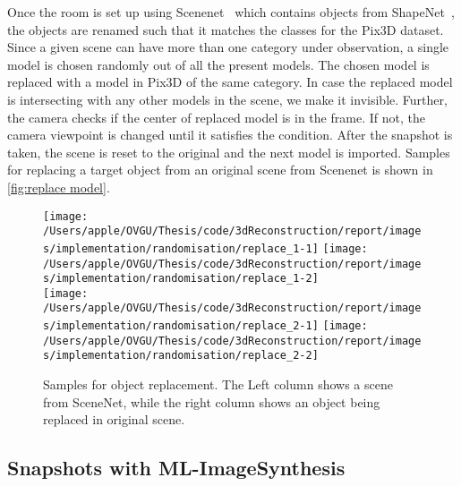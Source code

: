 Once the room is set up using Scenenet~\cite{McCormac:etal:ICCV2017} which contains objects from ShapeNet~\cite{chang2015shapenet}, the objects are renamed such that it matches the classes for the Pix3D dataset.
Since a given scene can have more than one category under observation, a single model is chosen randomly out of all the present models.
The chosen model is replaced with a model in Pix3D of the same category.
In case the replaced model is intersecting with any other models in the scene, we make it invisible.
Further, the camera checks if the center of replaced model is in the frame.
If not, the camera viewpoint is changed until it satisfies the condition.
After the snapshot is taken, the scene is reset to the original and the next model is imported.
Samples for replacing a target object from an original scene from Scenenet is shown in \autoref{fig:replace model}.

\begin{figure}
    \centering
        \texttt{[image: /Users/apple/OVGU/Thesis/code/3dReconstruction/report/images/implementation/randomisation/replace\_1-1]}
        \texttt{[image: /Users/apple/OVGU/Thesis/code/3dReconstruction/report/images/implementation/randomisation/replace\_1-2]} \\
        \vspace{0.1cm}
        \texttt{[image: /Users/apple/OVGU/Thesis/code/3dReconstruction/report/images/implementation/randomisation/replace\_2-1]}
        \texttt{[image: /Users/apple/OVGU/Thesis/code/3dReconstruction/report/images/implementation/randomisation/replace\_2-2]}\\
    \caption{Samples for object replacement. The Left column shows a scene from SceneNet, while the right column shows an object being replaced in original scene.}
    \label{fig:replace model}
\end{figure}

\subsection{Snapshots with ML-ImageSynthesis}\label{subsec:snapshots-with-ml-imagesynthesis}

